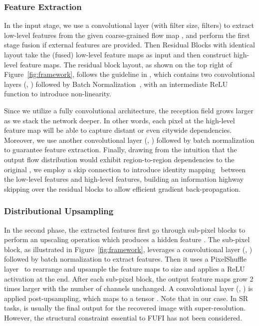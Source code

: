 \subsubsection{Feature Extraction}
In the input stage, we use a convolutional layer (with  filter size,  filters) to extract low-level features from the given coarse-grained flow map , and perform the first stage fusion if external features are provided. Then  Residual Blocks with identical layout take the (fused) low-level feature maps as input and then construct high-level feature maps. The residual block layout, as shown on the top right of Figure~\ref{fig:framework}, follows the guideline in \cite{ledig2017srgan}, which contains two convolutional layers (, ) followed by Batch Normalization~\cite{ioffe2015batch}, with an intermediate ReLU~\cite{hahnloser2000digital} function to introduce non-linearity.

Since we utilize a fully convolutional architecture, the reception field grows larger as we stack the network deeper. In other words, each pixel at the high-level feature map will be able to capture distant or even citywide dependencies. Moreover, we use another convolutional layer (, ) followed by batch normalization to guarantee feature extraction. Finally, drawing from the intuition that the output flow distribution would exhibit region-to-region dependencies to the original , we employ a skip connection to introduce identity mapping~\cite{he2016identity} between the low-level features and high-level features, building an information highway skipping over the residual blocks to allow efficient gradient back-propagation.

\vspace{-1mm}
\subsubsection{Distributional Upsampling}
In the second phase, the extracted features first go through  sub-pixel blocks to perform an  upscaling operation which produces a hidden feature . The sub-pixel block, as illustrated in Figure~\ref{fig:framework}, leverages a convolutional layer (, ) followed by batch normalization to extract features. Then it uses a PixelShuffle layer~\cite{shi2016espcn} to rearrange and upsample the feature maps to  size and applies a ReLU activation at the end. After each sub-pixel block, the output feature maps grow 2 times larger with the number of channels unchanged. A convolutional layer (, ) is applied post-upsampling, which maps  to a tensor . Note that  in our case. In SR tasks,  is usually the final output for the recovered image with super-resolution. However, the structural constraint essential to FUFI has not been considered.


